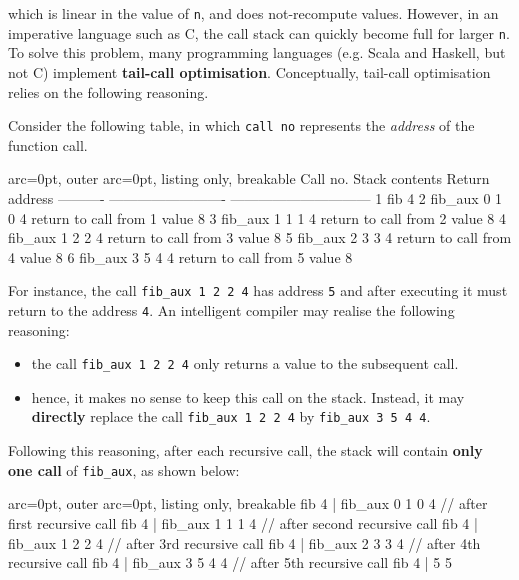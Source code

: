 which is linear in the value of \texttt{n}, and does not-recompute values. However, in an imperative language such as C, the call stack can quickly become full for larger \texttt{n}. To solve this problem, many programming languages (e.g. Scala and Haskell, but not C) implement \textbf{tail-call optimisation}. Conceptually, tail-call optimisation relies on the following reasoning.

Consider the following table, in which \texttt{call no} represents the \textit{address} of the function call.

\begin{tcblisting}{ arc=0pt, outer arc=0pt, listing only, breakable}
Call no.   Stack contents            Return address
---------- ------------------------- ------------------------------
1          fib 4                     
2          fib_aux 0 1 0 4           return to call from 1  value 8   
3          fib_aux 1 1 1 4           return to call from 2  value 8
4          fib_aux 1 2 2 4           return to call from 3  value 8
5          fib_aux 2 3 3 4           return to call from 4  value 8
6          fib_aux 3 5 4 4           return to call from 5  value 8  

\end{tcblisting}


For instance, the call \texttt{fib\_aux 1 2 2 4} has address \texttt{5} and after executing it must return to the address \texttt{4}. An intelligent compiler may realise the following reasoning:
\begin{itemize}
	\item  the call \texttt{fib\_aux 1 2 2 4} only returns a value to the subsequent call.
	\item  hence, it makes no sense to keep this call on the stack. Instead, it may \textbf{directly} replace the call \texttt{fib\_aux 1 2 2 4} by \texttt{fib\_aux 3 5 4 4}.
\end{itemize}
 
Following this reasoning, after each recursive call, the stack will contain \textbf{only one call} of \texttt{fib\_aux}, as shown below:

\begin{tcblisting}{ arc=0pt, outer arc=0pt, listing only, breakable}
fib 4 | fib_aux 0 1 0 4              // after first recursive call
fib 4 | fib_aux 1 1 1 4              // after second recursive call
fib 4 | fib_aux 1 2 2 4              // after 3rd recursive call
fib 4 | fib_aux 2 3 3 4              // after 4th recursive call
fib 4 | fib_aux 3 5 4 4              // after 5th recursive call
fib 4 | 5
5 

\end{tcblisting}


